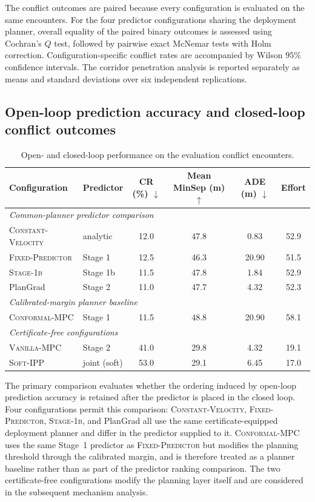 \documentclass[11pt]{article}
\theoremstyle{plain}
\theoremstyle{definition}
\newcommand{\method}{PlanGrad}
\begin{document}
The conflict outcomes are paired because every configuration is
evaluated on the same encounters. For the four predictor
configurations sharing the deployment planner, overall equality of
the paired binary outcomes is assessed using Cochran's $Q$ test,
followed by pairwise exact McNemar tests with Holm correction.
Configuration-specific conflict rates are accompanied by Wilson
$95\%$ confidence intervals. The corridor penetration analysis is
reported separately as means and standard deviations over six
independent replications.

\subsection{Open-loop prediction accuracy and closed-loop conflict outcomes}
\label{sec:results-ranking}

\begin{table}[tb]
	\centering
	\small
	\caption{Open- and closed-loop performance on the evaluation conflict encounters.}
	\label{tab:main-comparison}
	\begin{tabular}{llcccc}
		\toprule
		Configuration & Predictor
		& CR (\%) $\downarrow$
		& Mean MinSep (m) $\uparrow$
		& ADE (m) $\downarrow$
		& Effort \\
		\midrule
		\multicolumn{6}{l}{\emph{Common-planner predictor comparison}} \\
		\textsc{Constant-Velocity}
		& analytic
		& 12.0 & 47.8 & 0.83 & 52.9 \\
		\textsc{Fixed-Predictor}
		& Stage 1
		& 12.5 & 46.3 & 20.90 & 51.5 \\
		\textsc{Stage-1b}
		& Stage 1b
		& 11.5 & 47.8 & 1.84 & 52.9 \\
		\method
		& Stage 2
		& 11.0 & 47.7 & 4.32 & 52.3 \\
		\midrule
		\multicolumn{6}{l}{\emph{Calibrated-margin planner baseline}} \\
		\textsc{Conformal-MPC}
		& Stage 1
		& 11.5 & 48.8 & 20.90 & 58.1 \\
		\midrule
		\multicolumn{6}{l}{\emph{Certificate-free configurations}} \\
		\textsc{Vanilla-MPC}
		& Stage 2
		& 41.0 & 29.8 & 4.32 & 19.1 \\
		\textsc{Soft-IPP}
		& joint (soft)
		& 53.0 & 29.1 & 6.45 & 17.0 \\
		\bottomrule
	\end{tabular}
\end{table}

The primary comparison evaluates whether the ordering induced by
open-loop prediction accuracy is retained after the predictor is
placed in the closed loop. Four configurations permit this comparison:
\textsc{Constant-Velocity}, \textsc{Fixed-Predictor},
\textsc{Stage-1b}, and \method{} all use the same certificate-equipped
deployment planner and differ in the predictor supplied to it.
\textsc{Conformal-MPC} uses the same Stage~1 predictor as
\textsc{Fixed-Predictor} but modifies the planning threshold through
the calibrated margin, and is therefore treated as a planner baseline
rather than as part of the predictor ranking comparison. The two
certificate-free configurations modify the planning layer itself and
are considered in the subsequent mechanism analysis.
\end{document}
